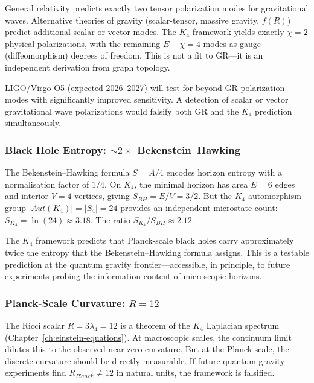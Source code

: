 \documentclass[11pt,a4paper]{book}
\def\text#1{#1}%
\begin{document}
General relativity predicts exactly two tensor polarization modes for gravitational waves. Alternative theories of gravity (scalar-tensor, massive gravity, $f(R)$) predict additional scalar or vector modes. The $K_4$ framework yields exactly $\chi = 2$ physical polarizations, with the remaining $E - \chi = 4$ modes as gauge (diffeomorphism) degrees of freedom. This is not a fit to GR---it is an independent derivation from graph topology.

LIGO/Virgo O5 (expected 2026--2027) will test for beyond-GR polarization modes with significantly improved sensitivity. A detection of scalar or vector gravitational wave polarizations would falsify both GR and the $K_4$ prediction simultaneously.

\subsubsection*{Black Hole Entropy: $\sim 2 \times$ Bekenstein--Hawking}

The Bekenstein--Hawking formula $S = A/4$ encodes horizon entropy with a normalisation factor of $1/4$. On $K_4$, the minimal horizon has area $E = 6$ edges and interior $V = 4$ vertices, giving $S_{BH} = E/V = 3/2$. But the $K_4$ automorphism group $|Aut(K_4)| = |S_4| = 24$ provides an independent microstate count: $S_{K_4} = \ln(24) \approx 3.18$. The ratio $S_{K_4} / S_{BH} \approx 2.12$.

The $K_4$ framework predicts that Planck-scale black holes carry approximately twice the entropy that the Bekenstein--Hawking formula assigns. This is a testable prediction at the quantum gravity frontier---accessible, in principle, to future experiments probing the information content of microscopic horizons.

\subsubsection*{Planck-Scale Curvature: $R = 12$}

The Ricci scalar $R = 3\lambda_4 = 12$ is a theorem of the $K_4$ Laplacian spectrum (Chapter~\ref{ch:einstein-equations}). At macroscopic scales, the continuum limit dilutes this to the observed near-zero curvature. But at the Planck scale, the discrete curvature should be directly measurable. If future quantum gravity experiments find $R_{\text{Planck}} \ne 12$ in natural units, the framework is falsified.
\end{document}
